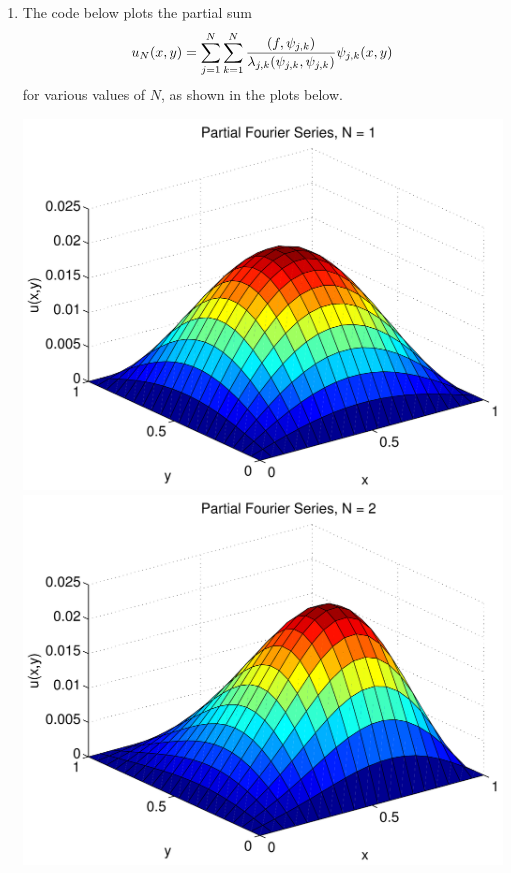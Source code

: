 {\begin{solution}
\begin{enumerate}
\item The code below plots the partial sum 
         \[ u_N(x,y) = \sum_{j=1}^N  \sum_{k=1}^N 
                       { (f,\psi_{j,k}) \over \lambda_{j,k} (\psi_{j,k}, \psi_{j,k})}
                       \psi_{j,k}(x,y)\]
      for various values of $N$, as shown in the plots below.

      \begin{center} 
          \includegraphics[scale=0.37]{twoD1}\quad
          \includegraphics[scale=0.37]{twoD2}


\end{center}
\end{enumerate}
\end{solution}}
